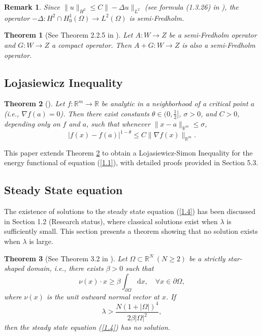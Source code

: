 \documentclass{article}
\numberwithin{equation}{section}
\newtheorem{theorem}{Theorem}[section]
\newtheorem{remark}{Remark}[section]
\begin{document}
\begin{remark}\label{delta}
    Since $\|u\|_{H^2} \le C\|-\Delta u\|_{L^2}$ (see formula (1.3.26) in \cite{ref8}), the operator $-\Delta: H^2 \cap H_0^1(\Omega) \to L^2(\Omega)$ is semi-Fredholm.
\end{remark}

\begin{theorem}[See Theorem 2.2.5 in \cite{ref13}]\label{lemma2.4}
    Let $A: W \to Z$ be a semi-Fredholm operator and $G: W \to Z$ a compact operator. Then $A + G: W \to Z$ is also a semi-Fredholm operator.
\end{theorem}

\subsection{Lojasiewicz Inequality}

\begin{theorem}[\cite{ref19}]\label{L-S}
    Let $f:\mathbb{R}^{m}\longrightarrow \mathbb{R}$ be analytic in a neighborhood of a critical point $a$ (i.e., $\nabla f(a)=0$). Then there exist constants $\theta\in (0,\frac{1}{2}]$, $\sigma>0$, and $C>0$, depending only on $f$ and $a$, such that whenever $\|x-a\|_{\mathbb{R}^{m}}\le \sigma$,
    $$|f(x)-f(a)|^{1-\theta}\le C\|\nabla f(x)\|_{\mathbb{R}^{m}}.$$
\end{theorem}

This paper extends Theorem \ref{L-S} to obtain a Lojasiewicz-Simon Inequality for the energy functional of equation (\ref{1.1}), with detailed proofs provided in Section 5.3.

\subsection{Steady State equation}

\qquad The existence of solutions to the steady state equation (\ref{1.4}) has been discussed in Section 1.2 (Research status), where classical solutions exist when $\lambda$ is sufficiently small. This section presents a theorem showing that no solution exists when $\lambda$ is large.

\begin{theorem}[See Theorem 3.2 in \cite{ref2}]\label{tuilun}
    Let $\Omega\subset\mathbb{R}^{N}\ (N\ge 2)$ be a strictly star-shaped domain, i.e., there exists $\beta>0$ such that
    $$\nu(x)\cdot x\ge \beta\int_{\partial\Omega}\mathrm{d}x,\quad \forall x\in \partial\Omega,$$
    where $\nu(x)$ is the unit outward normal vector at $x$. If $$\lambda>\frac{N(1+|\Omega|)^4}{2\beta |\Omega|^2},$$
    then the steady state equation (\ref{1.4}) has no solution.
\end{theorem}
\end{document}
